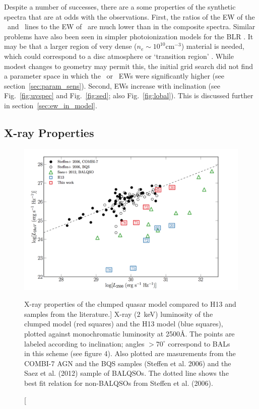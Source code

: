 Despite a number of successes, 
there are a some properties of the synthetic spectra
that are at odds with the observations. First, the ratios of the 
EW of the \la\ and \mgline\ lines
to the EW of \civline\ are much lower than in the composite spectra. 
Similar problems have also been seen in simpler photoionization models for the 
BLR \citep{netzer1990}.
It may be that a larger region of very dense ($n_e\sim10^{10}$cm$^{-3}$) 
material is needed, which could correspond to a disc atmosphere or 
`transition region' 
\citep[see e.g.][]{MCGV95,knigge1998}. \nocite{knigge1998} 
While modest changes to geometry may permit this, the initial grid search 
did not find a parameter space in which the \la\ or \mg\ EWs
were significantly higher (see section~\ref{sec:param_sens}). 
Second, EWs increase with inclination 
(see Fig.~\ref{fig:uvspec} and Fig.~\ref{fig:sed}; also Fig.~\ref{fig:lobal}).
This is discussed further in section~\ref{sec:ew_in_model}.

\subsection{X-ray Properties}
\label{sec:xray}


\begin{figure}
\centering
\includegraphics[width=1.0\textwidth]{figures/06-agnpaper/fig6.png}
\caption
[X-ray properties of the clumped quasar model compared to H13 and samples
from the literature.]
{
X-ray ($2$~keV) luminosity of the clumped model (red squares) 
and the H13 model (blue squares), plotted against monochromatic luminosity 
at 2500\AA. The points are labeled according to inclination; angles
$>70^\circ$ correspond to BALs in this scheme (see figure 4).
Also plotted are masurements from 
the COMBI-7 AGN and the BQS samples (Steffen et al. 2006) and the Saez et al. (2012) 
sample of BALQSOs. The dotted line shows the best fit relation for non-BALQSOs 
from Steffen et al. (2006).
}
\label{fig:xray}
\end{figure}

